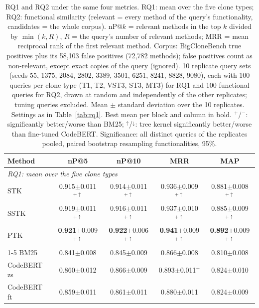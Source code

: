 \begin{table}[t]
\centering
\caption{RQ1 and RQ2 under the same four metrics. RQ1: mean over the five clone types; RQ2: functional similarity (relevant = every method of the query's functionality, candidates = the whole corpus). nP@$k$ = relevant methods in the top $k$ divided by $\min(k, R)$, $R$ = the query's number of relevant methods; MRR = mean reciprocal rank of the first relevant method. Corpus: BigCloneBench true positives plus its 58,103 false positives (72,782 methods); false positives count as non-relevant, except exact copies of the query (ignored). 10 replicate query sets (seeds 55, 1375, 2084, 2802, 3389, 3501, 6251, 8241, 8828, 9080), each with 100 queries per clone type (T1, T2, VST3, ST3, MT3) for RQ1 and 100 functional queries for RQ2, drawn at random and independently of the other replicates; tuning queries excluded. Mean $\pm$ standard deviation over the 10 replicates. Settings as in Table~\ref{tab:rq1}. Best mean per block and column in bold. $^{+}$/$^{-}$: significantly better/worse than BM25; $^{\uparrow}$/$^{\downarrow}$: tree kernel significantly better/worse than fine-tuned CodeBERT. Significance: all distinct queries of the replicates pooled, paired bootstrap resampling functionalities, 95\%.}
\label{tab:metrics}
\footnotesize
\setlength{\tabcolsep}{3.5pt}
\begin{tabular}{lcccc}
\toprule
Method & nP@5 & nP@10 & MRR & MAP \\
\midrule
\multicolumn{5}{l}{\emph{RQ1: mean over the five clone types}} \\
\quad STK & 0.915$\pm$0.011$^{+\uparrow}$ & 0.914$\pm$0.011$^{+\uparrow}$ & 0.936$\pm$0.009$^{+\uparrow}$ & 0.881$\pm$0.008$^{+\uparrow}$ \\
\quad SSTK & 0.919$\pm$0.011$^{+\uparrow}$ & 0.916$\pm$0.011$^{+\uparrow}$ & 0.937$\pm$0.010$^{+\uparrow}$ & 0.885$\pm$0.009$^{+\uparrow}$ \\
\quad PTK & \textbf{0.921}$\pm$0.009$^{+\uparrow}$ & \textbf{0.922}$\pm$0.006$^{+\uparrow}$ & \textbf{0.941}$\pm$0.009$^{+\uparrow}$ & \textbf{0.892}$\pm$0.009$^{+\uparrow}$ \\
\cmidrule(lr){1-5}
\quad BM25 & 0.841$\pm$0.008 & 0.845$\pm$0.009 & 0.866$\pm$0.008 & 0.810$\pm$0.008 \\
\quad CodeBERT zs & 0.860$\pm$0.012 & 0.866$\pm$0.009 & 0.893$\pm$0.011$^{+}$ & 0.824$\pm$0.010 \\
\quad CodeBERT ft & 0.859$\pm$0.011 & 0.861$\pm$0.011 & 0.880$\pm$0.011 & 0.824$\pm$0.009 \\

\end{tabular}
\end{table}
